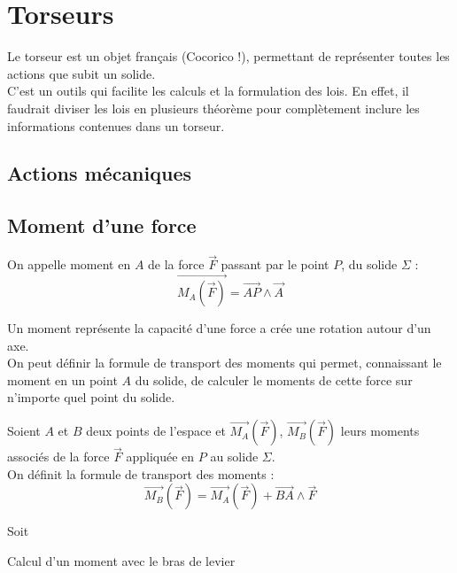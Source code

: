 \chapter{Torseurs}
Le torseur est un objet français (Cocorico !), permettant de représenter toutes les actions que subit un solide.\\
C'est un outils qui facilite les calculs et la formulation des lois.
En effet, il faudrait diviser les lois en plusieurs théorème pour complètement inclure les informations contenues dans un torseur.
\section{Actions mécaniques}
\section{Moment d'une force}
\begin{defi}
On appelle moment en $A$ de la force $\overrightarrow{F}$ passant par le point $P$, du solide $\Sigma$ :
$$\overrightarrow{M_{A}(\overrightarrow{F})}=\overrightarrow{AP}\land\overrightarrow{A}$$
\end{defi}
Un moment représente la capacité d'une force a crée une rotation autour d'un axe.\\
On peut définir la formule de transport des moments qui permet, connaissant le moment en un point $A$ du solide, de calculer le moments de cette force sur n'importe quel point du solide.
\begin{prop}
Soient $A$ et $B$ deux points de l'espace et $\overrightarrow{M_{A}}(\overrightarrow{F})$, $\overrightarrow{M_{B}}(\overrightarrow{F})$ leurs moments associés de la force $\overrightarrow{F}$ appliquée en $P$ au solide $\Sigma$.\\
On définit la formule de transport des moments :
$$\overrightarrow{M_{B}}(\overrightarrow{F})=\overrightarrow{M_{A}}(\overrightarrow{F})+\overrightarrow{BA}\land\overrightarrow{F}$$
\end{prop}
\begin{demo}
Soit
\end{demo}
\begin{meth}
Calcul d'un moment avec le bras de levier

\end{meth}
